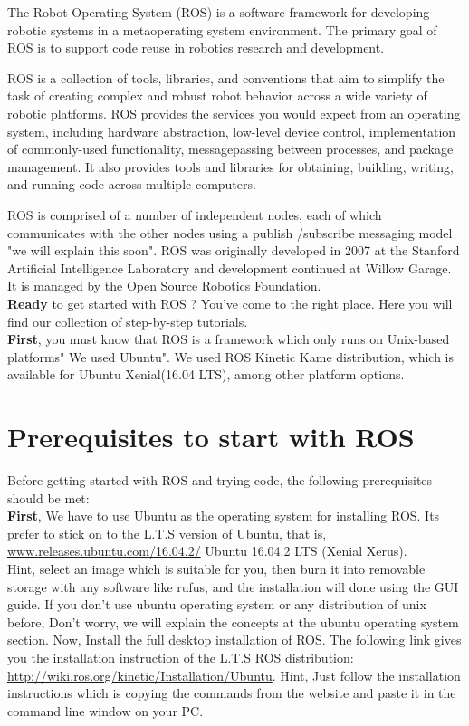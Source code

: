 The Robot Operating System (ROS) is a software framework for developing robotic systems in a metaoperating system environment. The primary goal of ROS is to support code reuse in robotics research and development.

ROS is a collection of tools, libraries, and conventions that aim to simplify the task of creating complex and robust robot behavior across a wide variety of robotic platforms.
ROS provides the services you would expect from an operating system, including hardware abstraction, low-level device control, implementation of commonly-used functionality, messagepassing between processes, and package management.
It also provides tools and libraries for obtaining, building, writing, and running code across multiple computers. 

ROS is comprised of a number of independent nodes, each of which communicates with the other nodes using a publish /subscribe messaging model "we will explain this soon". 
ROS was originally developed in 2007 at the Stanford Artificial Intelligence Laboratory and development continued at Willow Garage. It is managed by the Open Source Robotics Foundation.\\


\textbf{Ready} to get started with ROS ? You’ve come to the right place. Here you will find our collection of step-by-step tutorials.\\


\textbf{First}, you must know that ROS is a framework which only runs on Unix-based platforms" We used Ubuntu". 
We used ROS Kinetic Kame distribution, which is available for Ubuntu Xenial(16.04 LTS), among other platform options.


 \section{Prerequisites to start with ROS}
 	Before getting started with ROS and trying code, the following prerequisites should be met:\\
 
 	\textbf{First}, We have to use Ubuntu as the operating system for installing ROS.
  	Its prefer to stick on to the L.T.S version of Ubuntu, that is, \url{www.releases.ubuntu.com/16.04.2/} Ubuntu 16.04.2 LTS (Xenial Xerus).\\
  	Hint, select an image which is suitable for you, then burn it into removable storage with any software like rufus, and the installation will done using the GUI guide.
  	If you don't use ubuntu operating system or any distribution of unix before, Don't worry, we will explain the concepts at the ubuntu operating system section. 
  	Now, Install the full desktop installation of ROS. The following link gives you the installation instruction of the L.T.S ROS distribution: \url{http://wiki.ros.org/kinetic/Installation/Ubuntu}. 
  	Hint, Just follow the installation instructions which is copying the commands from the website and paste it in the command line window on your PC.
